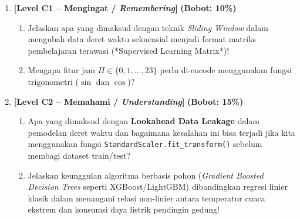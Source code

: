 \documentclass[11pt,a4paper]{article}
\begin{document}
\begin{enumerate}[leftmargin=1.5em, label=\textbf{Soal \arabic*.}]

    \item \textbf{[Level C1 -- Mengingat / \textit{Remembering}]} \hfill \textbf{(Bobot: 10\%)}
    \begin{enumerate}[label=\alph*.]
        \item Jelaskan apa yang dimaksud dengan teknik \textit{Sliding Window} dalam mengubah data deret waktu sekuensial menjadi format matriks pembelajaran terawasi (*Supervised Learning Matrix*)!
        \item Mengapa fitur jam $H \in \{0, 1, \dots, 23\}$ perlu di-encode menggunakan fungsi trigonometri ($\sin$ dan $\cos$)?
    \end{enumerate}

    \vspace{0.3cm}

    \item \textbf{[Level C2 -- Memahami / \textit{Understanding}]} \hfill \textbf{(Bobot: 15\%)}
    \begin{enumerate}[label=\alph*.]
        \item Apa yang dimaksud dengan \textbf{Lookahead Data Leakage} dalam pemodelan deret waktu dan bagaimana kesalahan ini bisa terjadi jika kita menggunakan fungsi \texttt{StandardScaler.fit\_transform()} sebelum membagi dataset train/test?
        \item Jelaskan keunggulan algoritma berbasis pohon (\textit{Gradient Boosted Decision Trees} seperti XGBoost/LightGBM) dibandingkan regresi linier klasik dalam menangani relasi non-linier antara temperatur cuaca ekstrem dan konsumsi daya listrik pendingin gedung!
    \end{enumerate}

    \vspace{0.3cm}


\end{enumerate}
\end{document}
